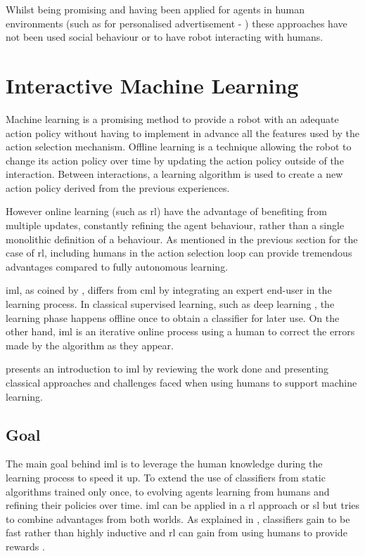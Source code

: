 	Whilst being promising and having been applied for agents in human environments (such as for personalised advertisement - \citealt{theocharous2015personalized})	these approaches have not been used social behaviour or to have robot interacting with humans.

\section{Interactive Machine Learning} \label{sec:back_iml}

Machine learning is a promising method to provide a robot with an adequate action policy without having to implement in advance all the features used by the action selection mechanism. Offline learning is a technique allowing the robot to change its action policy over time by updating the action policy outside of the interaction. Between interactions, a learning algorithm is used to create a new action policy derived from the previous experiences.

However online learning (such as \gls{rl}) have the advantage of benefiting from multiple updates, constantly refining the agent behaviour, rather than a single monolithic definition of a behaviour. As mentioned in the previous section for the case of \gls{rl}, including humans in the action selection loop can provide tremendous advantages compared to fully autonomous learning.

\acrfull{iml}, as coined by \cite{fails2003interactive}, differs from \acrfull{cml} by integrating an expert end-user in the learning process. In classical supervised learning, such as deep learning \cite{lecun2015deep}, the learning phase happens offline once to obtain a classifier for later use. On the other hand, \acrshort{iml} is an iterative online process using a human to correct the errors made by the algorithm as they appear.

\cite{amershi2014power} presents an introduction to \gls{iml} by reviewing the work done and presenting classical approaches and challenges faced when using humans to support machine learning.

\subsection{Goal}

The main goal behind \gls{iml} is to leverage the human knowledge during the learning process to speed it up. To extend the use of classifiers from static algorithms trained only once, to evolving agents learning from humans and refining their policies over time. \gls{iml} can be applied in a \gls{rl} approach or \gls{sl} but tries to combine advantages from both worlds. As explained in \cite{fails2003interactive}, classifiers gain to be fast rather than highly inductive and \gls{rl} can gain from using humans to provide rewards \cite{knox2009interactively}.

